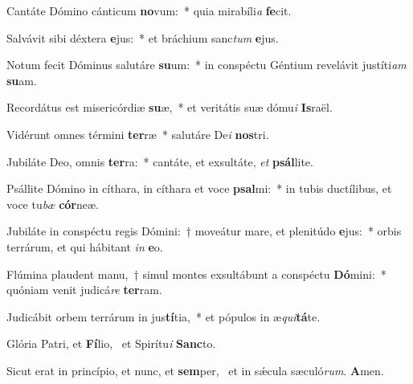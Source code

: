\item Cantáte Dómino cánticum \textbf{no}vum:~* quia mirabíli\textit{a} \textbf{fe}cit.
\item Salvávit sibi déxtera \textbf{e}jus:~* et bráchium sanc\textit{tum} \textbf{e}jus.
\item Notum fecit Dóminus salutáre \textbf{su}um:~* in conspéctu Géntium revelávit justíti\textit{am} \textbf{su}am.
\item Recordátus est misericórdiæ \textbf{su}æ,~* et veritátis suæ dómu\textit{i} \textbf{Is}raël.
\item Vidérunt omnes términi \textbf{ter}ræ~* salutáre De\textit{i} \textbf{nos}tri.
\item Jubiláte Deo, omnis \textbf{ter}ra:~* cantáte, et exsultáte, \textit{et} \textbf{psál}lite.
\item Psállite Dómino in cíthara, in cíthara et voce \textbf{psal}mi:~* in tubis ductílibus, et voce tu\textit{bæ} \textbf{cór}neæ.
\item Jubiláte in conspéctu regis Dómini:~† moveátur mare, et plenitúdo \textbf{e}jus:~* orbis terrárum, et qui hábitant \textit{in} \textbf{e}o.
\item Flúmina plaudent manu,~† simul montes exsultábunt a conspéctu \textbf{Dó}mini:~* quóniam venit judicá\textit{re} \textbf{ter}ram.
\item Judicábit orbem terrárum in jus\textbf{tí}tia,~* et pópulos in æ\textit{qui}\textbf{tá}te.
\item Glória Patri, et \textbf{Fí}lio,~\psstar{} et Spirítu\textit{i} \textbf{Sanc}to.
\item Sicut erat in princípio, et nunc, et \textbf{sem}per,~\psstar{} et in sǽcula sæculó\textit{rum}. \textbf{A}men.